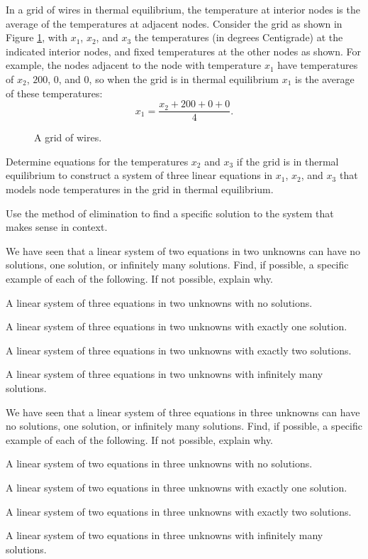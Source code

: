\item In a grid of wires in thermal equilibrium, the temperature at interior nodes is the average of the temperatures at adjacent nodes. Consider the grid as shown in Figure \ref{F:Grid}, with $x_1$, $x_2$, and $x_3$ the temperatures (in degrees Centigrade) at the indicated interior nodes, and fixed temperatures at the other nodes as shown. For example, the nodes adjacent to the node with temperature $x_1$ have temperatures of $x_2$, $200$, $0$, and $0$, so when the grid is in thermal equilibrium $x_1$ is the average of these temperatures:
\[x_1 = \frac{x_2+200+0+0}{4}.\]
\begin{figure}[h]
\begin{center}
\caption{A grid of wires.}
\label{F:Grid}
\end{center}
\end{figure}
	\ba
	\item Determine equations for the temperatures $x_2$ and $x_3$ if the grid is in thermal equilibrium to construct a system of three linear equations in $x_1$, $x_2$, and $x_3$ that models node temperatures in the grid in thermal equilibrium.

	\item Use the method of elimination to find a specific solution to the system that makes sense in context.  

	\ea

\item We have seen that a linear system of two equations in two unknowns can have no solutions, one solution, or infinitely many solutions. Find, if possible, a specific example of each of the following. If not possible, explain why.
	\ba
	\item A linear system of three equations in two unknowns with no solutions.
	\item A linear system of three equations in two unknowns with exactly one solution.
	\item A linear system of three equations in two unknowns with exactly two solutions.
	\item A linear system of three equations in two unknowns with infinitely many solutions.
	\ea

\item We have seen that a linear system of three equations in three unknowns can have no solutions, one solution, or infinitely many solutions. Find, if possible, a specific example of each of the following. If not possible, explain why.
	\ba
	\item A linear system of two equations in three unknowns with no solutions.
	\item A linear system of two equations in three unknowns with exactly one solution.
	\item A linear system of two equations in three unknowns with exactly two solutions.
	\item A linear system of two equations in three unknowns with infinitely many solutions.
	\ea
		
